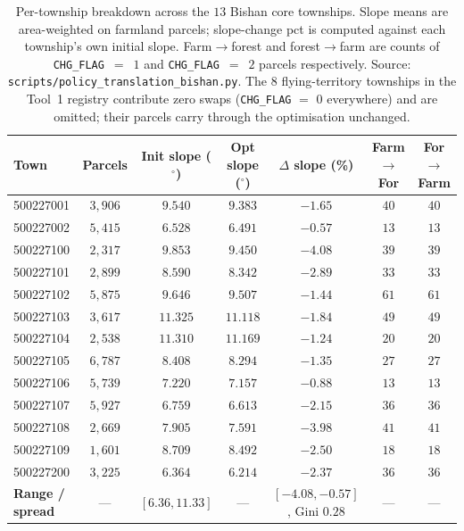 \documentclass[11pt]{article}
\begin{document}
\begin{table}[htbp]
\centering
\small
\caption{Per-township breakdown across the $13$ Bishan core townships. Slope means are area-weighted on farmland parcels; slope-change pct is computed against each township's own initial slope. Farm$\to$forest and forest$\to$farm are counts of \texttt{CHG\_FLAG}~$=$~$1$ and \texttt{CHG\_FLAG}~$=$~$2$ parcels respectively. Source: \texttt{scripts/policy\_translation\_bishan.py}. The 8 flying-territory townships in the Tool~1 registry contribute zero swaps (\texttt{CHG\_FLAG} $=$ $0$ everywhere) and are omitted; their parcels carry through the optimisation unchanged.}
\label{tab:si-policy-township}
\begin{tabular}{lcccccc}
\toprule
Town & Parcels & Init slope ($^\circ$) & Opt slope ($^\circ$) & $\Delta$ slope (\%) & Farm$\to$For & For$\to$Farm \\
\midrule
500227001 & $3{,}906$ & $9.540$ & $9.383$ & $-1.65$ & $40$ & $40$ \\
500227002 & $5{,}415$ & $6.528$ & $6.491$ & $-0.57$ & $13$ & $13$ \\
500227100 & $2{,}317$ & $9.853$ & $9.450$ & $-4.08$ & $39$ & $39$ \\
500227101 & $2{,}899$ & $8.590$ & $8.342$ & $-2.89$ & $33$ & $33$ \\
500227102 & $5{,}875$ & $9.646$ & $9.507$ & $-1.44$ & $61$ & $61$ \\
500227103 & $3{,}617$ & $11.325$ & $11.118$ & $-1.84$ & $49$ & $49$ \\
500227104 & $2{,}538$ & $11.310$ & $11.169$ & $-1.24$ & $20$ & $20$ \\
500227105 & $6{,}787$ & $8.408$ & $8.294$ & $-1.35$ & $27$ & $27$ \\
500227106 & $5{,}739$ & $7.220$ & $7.157$ & $-0.88$ & $13$ & $13$ \\
500227107 & $5{,}927$ & $6.759$ & $6.613$ & $-2.15$ & $36$ & $36$ \\
500227108 & $2{,}669$ & $7.905$ & $7.591$ & $-3.98$ & $41$ & $41$ \\
500227109 & $1{,}601$ & $8.709$ & $8.492$ & $-2.50$ & $18$ & $18$ \\
500227200 & $3{,}225$ & $6.364$ & $6.214$ & $-2.37$ & $36$ & $36$ \\
\midrule
\textbf{Range / spread} & — & $[6.36, 11.33]$ & — & $\mathbf{[-4.08, -0.57]}$, Gini $\mathbf{0.28}$ & — & — \\
\bottomrule
\end{tabular}
\end{table}
\end{document}
